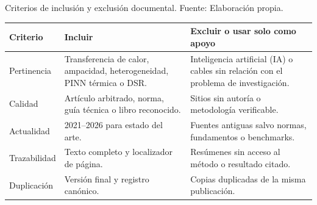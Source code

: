 \begin{landscape}
\begin{center}
\vspace{1.0em}

\caption{Criterios de inclusión y exclusión documental. Fuente: Elaboración propia.}
\label{tab:criterios-documentales}
\footnotesize
\setlength{\tabcolsep}{5pt}
\renewcommand{\arraystretch}{1.18}
\begin{tabularx}{\linewidth}{L{3.2cm}Y Y}
\toprule
\textbf{Criterio} & \textbf{Incluir} & \textbf{Excluir o usar solo como apoyo} \\
\midrule
Pertinencia & Transferencia de calor, ampacidad, heterogeneidad, PINN térmica o DSR. & Inteligencia artificial (IA) o cables sin relación con el problema de investigación. \\
Calidad & Artículo arbitrado, norma, guía técnica o libro reconocido. & Sitios sin autoría o metodología verificable. \\
Actualidad & 2021--2026 para estado del arte. & Fuentes antiguas salvo normas, fundamentos o benchmarks. \\
Trazabilidad & Texto completo y localizador de página. & Resúmenes sin acceso al método o resultado citado. \\
Duplicación & Versión final y registro canónico. & Copias duplicadas de la misma publicación. \\
\bottomrule
\end{tabularx}
\end{center}
\end{landscape}

